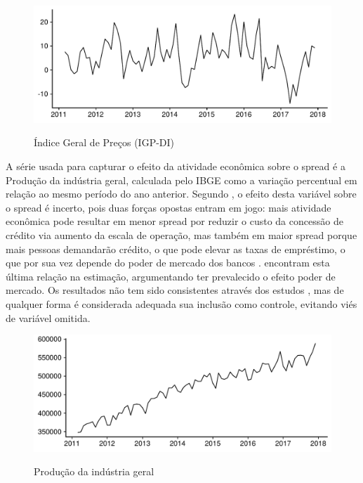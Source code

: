 \documentclass[a4paper, article, 12pt, openany, oneside, english, brazil]{abntex2}
\numberwithin{equation}{section}
\begin{document}
\begin{figure}[h]
  \centering
    \caption{Índice Geral de Preços (IGP-DI)}
      \includegraphics[width = \textwidth, scale=0.75]{IGP.pdf}
      \label{ipca}
\end{figure}
    
A série usada para capturar o efeito da atividade econômica sobre o spread é a Produção da indústria geral, calculada pelo IBGE como a variação percentual em relação ao mesmo período do ano anterior. Segundo , o efeito desta variável sobre o spread é incerto, pois duas forças opostas entram em jogo: mais atividade econômica pode resultar em menor spread por reduzir o custo da concessão de crédito via aumento da escala de operação, mas também em maior spread porque mais pessoas demandarão crédito, o que pode elevar as taxas de empréstimo, o que por sua vez depende do poder de mercado dos bancos .  encontram esta última relação na estimação, argumentando ter prevalecido o efeito poder de mercado. Os resultados não tem sido consistentes através dos estudos \cite[p.~236]{leal07}, mas de qualquer forma é considerada adequada sua inclusão como controle, evitando viés de variável omitida.
    
\begin{figure}[h]
  \centering
  \caption{Produção da indústria geral}
      \includegraphics[width = \textwidth, scale=0.75]{PIB_Mensal.pdf}
      \label{prodind}
\end{figure}
    
\end{document}
